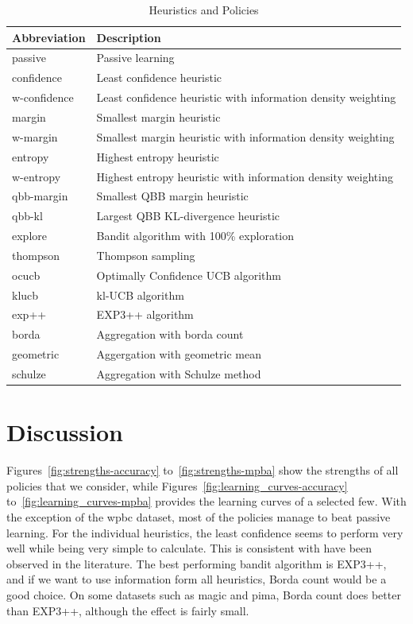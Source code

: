 \documentclass[fleqn,10pt,lineno]{wlpeerj} %
\begin{document}
\begin{table}[htbp]
	\caption {Heuristics and Policies} \label{tab:abbre}
	\centering
	\begin{tabular}{ll}
		\toprule
		{Abbreviation}  & Description \\
		\midrule
        passive
        	& Passive learning \\
		confidence
			& Least confidence heuristic \\
		w-confidence
        	& Least confidence heuristic with information density weighting \\
        margin
        	& Smallest margin heuristic \\
        w-margin
        	& Smallest margin heuristic with information density weighting \\
        entropy
        	& Highest entropy heuristic \\
		w-entropy
        	& Highest entropy heuristic with information density weighting \\
        qbb-margin
        	& Smallest QBB margin heuristic \\
		qbb-kl
        	& Largest QBB KL-divergence heuristic \\
        explore
			& Bandit algorithm with 100\% exploration \\
		thompson
        	& Thompson sampling \\
		ocucb
			& Optimally Confidence UCB algorithm \\
		klucb
			& kl-UCB algorithm \\
		exp++
			& EXP3++ algorithm \\
		borda
			& Aggregation with borda count \\
		geometric
			& Aggergation with geometric mean \\
		schulze
			& Aggregation with Schulze method \\
		\bottomrule
	\end{tabular}
\end{table}

\section{Discussion}

Figures~\ref{fig:strengths-accuracy} to~\ref{fig:strengths-mpba} show the
strengths of all policies that we consider, while
Figures~\ref{fig:learning_curves-accuracy} to~\ref{fig:learning_curves-mpba}
provides the learning curves of a selected few. With the exception of the wpbc
dataset, most of the policies manage to beat passive learning. For the
individual heuristics, the least confidence seems to perform very well while
being very simple to calculate. This is consistent with have been observed in
the literature. The best performing bandit algorithm is EXP3++, and if we want
to use information form all heuristics, Borda count would be a good choice. On
some datasets such as magic and pima, Borda count does better than EXP3++,
although the effect is fairly small.
\end{document}
